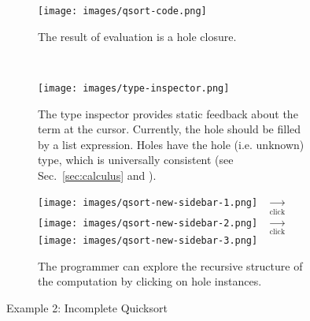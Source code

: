 
\begin{figure}[t]
\begin{subfigure}[t]{0.70\textwidth}
\centering
\texttt{[image: images/qsort-code.png]}
\vspace{-3px}
\caption{The result of evaluation is a hole closure.}
\label{fig:qsort-example-code}
\end{subfigure}
~
\begin{subfigure}[t]{0.29\textwidth}
\centering
\texttt{[image: images/type-inspector.png]}
\vspace{-3px}
\caption{The type inspector provides static feedback about the term at the cursor. Currently, the hole should be filled by a list expression. Holes have the hole (i.e. unknown) type, which  is universally consistent (see Sec.~\ref{sec:calculus} and \cite{popl-paper}).
}
\label{fig:qsort-type-inspector}
\end{subfigure}

\vspace{8px}

\begin{subfigure}[t]{\textwidth}
\centering
\texttt{[image: images/qsort-new-sidebar-1.png]}
~$\xrightarrow[\text{click}]{}$
\texttt{[image: images/qsort-new-sidebar-2.png]}
~$\xrightarrow[\text{click}]{}$
\texttt{[image: images/qsort-new-sidebar-3.png]}
\caption{The programmer can explore the recursive structure of the computation by clicking on hole instances.}
\label{fig:qsort-sidebars}
\end{subfigure}

\vspace{3px}

\caption{Example 2: Incomplete Quicksort}
\label{fig:qsort-cell-mockup}

\end{figure}



